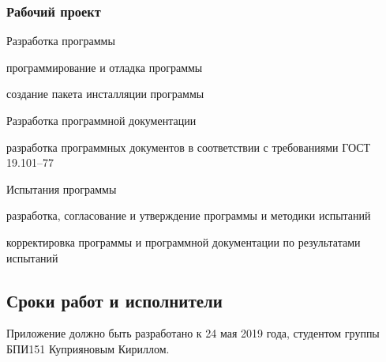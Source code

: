 \subsubsection{Рабочий проект}
\begin{my_enumerate}
    \item Разработка программы
        \begin{my_enumerate}
            \item программирование и отладка программы
            \item создание пакета инсталляции программы
        \end{my_enumerate}
    \item Разработка программной документации
        \begin{my_enumerate}
            \item разработка программных документов в соответствии с
                  требованиями ГОСТ 19.101--77
        \end{my_enumerate}
     \item Испытания программы
           \begin{my_enumerate}
             \item разработка, согласование и утверждение программы и методики испытаний
            \item корректировка программы и программной документации по результатами испытаний
         \end{my_enumerate}
\end{my_enumerate}

\subsection{Сроки работ и исполнители}

Приложение должно быть разработано к 24 мая 2019 года, студентом группы БПИ151
Куприяновым Кириллом.


